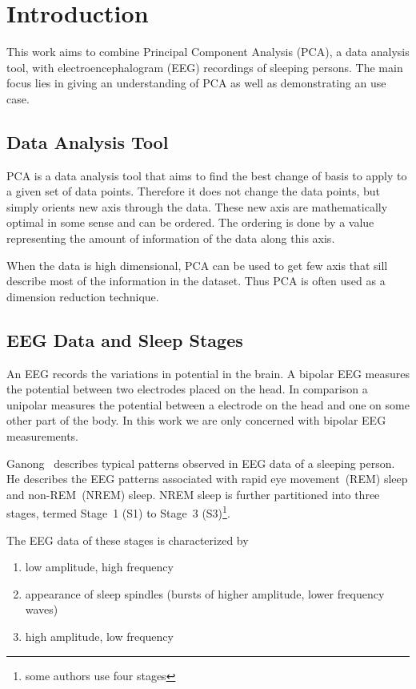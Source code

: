 \chapter{Introduction}
\label{chapter:introduction}

This work aims to combine Principal Component Analysis (PCA), a data analysis tool, with electroencephalogram (EEG) recordings of sleeping persons. The main focus lies in giving an understanding of PCA as well as demonstrating an use case.

\section{Data Analysis Tool}

PCA is a data analysis tool that aims to find the best change of basis to apply to a given set of data points. Therefore it does not change the data points, but simply orients new axis through the data. These new axis are mathematically optimal in some sense and can be ordered. The ordering is done by a value representing the amount of information of the data along this axis.

When the data is high dimensional, PCA can be used to get few axis that sill describe most of the information in the dataset. Thus PCA is often used as a dimension reduction technique.


\section{EEG Data and Sleep Stages}
\label{sec:eeg_data_and_sleep_stages}

An EEG records the variations in potential in the brain. A bipolar EEG measures the potential between two electrodes placed on the head. In comparison a unipolar measures the potential between a electrode on the head and one on some other part of the body. In this work we are only concerned with bipolar EEG measurements.

Ganong~\cite[chapter~11]{Ganong1997} describes typical patterns observed in EEG data of a sleeping person. He describes the EEG patterns associated with rapid eye movement~(REM) sleep and non-REM~(NREM) sleep. NREM sleep is further partitioned into three stages, termed Stage~1 (S1) to Stage~3 (S3)\footnote{some authors use four stages}. 

The EEG data of these stages is characterized by

\begin{enumerate}[label={S\arabic*:}]
	\item low amplitude, high frequency
	\item appearance of sleep spindles (bursts of higher amplitude, lower frequency waves)
	\item high amplitude, low frequency
\end{enumerate}

